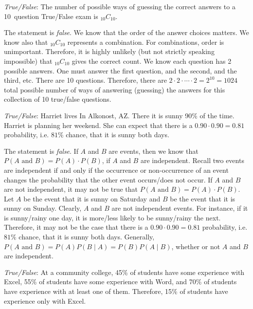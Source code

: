 \documentclass[11pt,letterpaper]{article}
\begin{document}
\quizsol \textit{True/False}: The number of possible ways of guessing the correct answers to a 10~question True/False exam is $_{10}C_{10}$. \pspace

\sol The statement is \textit{false}. We know that the order of the answer choices matters. We know also that $_{10}C_{10}$ represents a combination. For combinations, order is unimportant. Therefore, it is highly unlikely (but not strictly speaking impossible) that $_{10}C_{10}$ gives the correct count. We know each question has 2 possible answers. One must answer the first question, and the second, and the third, etc. There are 10 questions. Therefore, there are $2 \cdot 2 \cdot \cdots \cdot 2= 2^{10}= 1024$ total possible number of ways of answering (guessing) the answers for this collection of 10 true/false questions. \pvspace{1.3cm}



\quizsol \textit{True/False}: Harriet lives In Alkonost, AZ. There it is sunny 90\% of the time. Harriet is planning her weekend. She can expect that there is a $0.90 \cdot 0.90= 0.81$ probability, i.e. $81\%$ chance, that it is sunny both days. \pspace

\sol The statement is \textit{false}. If $A$ and $B$ are events, then we know that $P(A \text{ and } B)= P(A) \cdot P(B)$, if $A$ and $B$ are independent. Recall two events are independent if and only if the occurrence or non-occurrence of an event changes the probability that the other event occurs/does not occur. If $A$ and $B$ are not independent, it may not be true that $P(A \text{ and } B)= P(A) \cdot P(B)$. Let $A$ be the event that it is sunny on Saturday and $B$ be the event that it is sunny on Sunday. Clearly, $A$ and $B$ are not independent events. For instance, if it is sunny/rainy one day, it is more/less likely to be sunny/rainy the next. Therefore, it may not be the case that there is a $0.90 \cdot 0.90= 0.81$ probability, i.e. $81\%$ chance, that it is sunny both days. Generally, $P(A \text{ and } B)= P(A) P(B \;|\; A)= P(B) P(A \;|\; B)$, whether or not $A$ and $B$ are independent. \pvspace{1.3cm}



\quizsol \textit{True/False}: At a community college, 45\% of students have some experience with Excel, 55\% of students have some experience with Word, and 70\% of students have experience with at least one of them. Therefore, 15\% of students have experience only with Excel. \pspace
\end{document}
